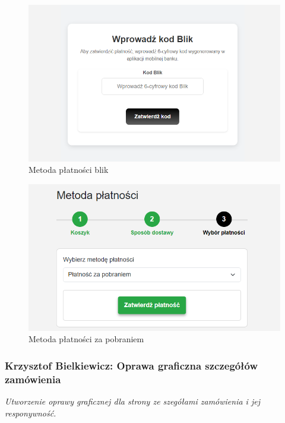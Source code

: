 \documentclass[12pt,a4paper,oneside]{article}
\theoremstyle{definition}
\numberwithin{equation}{section}
\begin{document}
\begin{figure}[H]
    \centering
    \includegraphics[width=1.0\columnwidth]{images/krzysztofBImages/cart/metody-płatności-blik.png}
    \caption{Metoda płatności blik}
    \label{płatność-blik}
\end{figure}

\begin{figure}[H]
    \centering
    \includegraphics[width=0.8\columnwidth]{images/krzysztofBImages/cart/metody-płatności-za-pobraniem.png}
    \caption{Metoda płatności za pobraniem}
    \label{płatność-zapobraniem}
\end{figure}

\subsubsection{Krzysztof Bielkiewicz: Oprawa graficzna szczegółów zamówienia}
\label{1.3.11}
\textit{Utworzenie oprawy graficznej dla strony ze szegółami zamówienia i jej responywność.}
\end{document}
